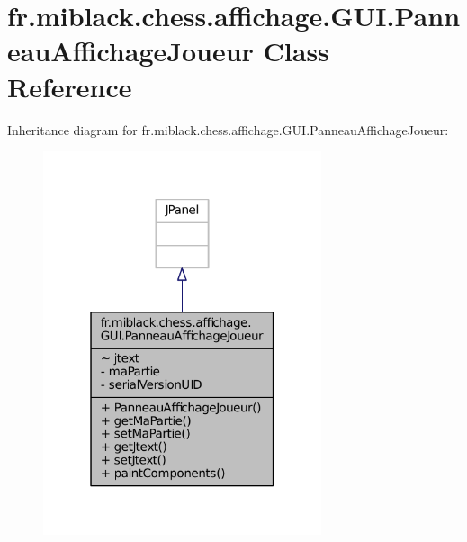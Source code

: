\section{fr.\-miblack.\-chess.\-affichage.\-G\-U\-I.\-Panneau\-Affichage\-Joueur Class Reference}
\label{classfr_1_1miblack_1_1chess_1_1affichage_1_1GUI_1_1PanneauAffichageJoueur}


Inheritance diagram for fr.\-miblack.\-chess.\-affichage.\-G\-U\-I.\-Panneau\-Affichage\-Joueur\-:
\nopagebreak
\begin{figure}[H]
\begin{center}
\leavevmode
\includegraphics[width=232pt]{classfr_1_1miblack_1_1chess_1_1affichage_1_1GUI_1_1PanneauAffichageJoueur__inherit__graph}
\end{center}
\end{figure}


